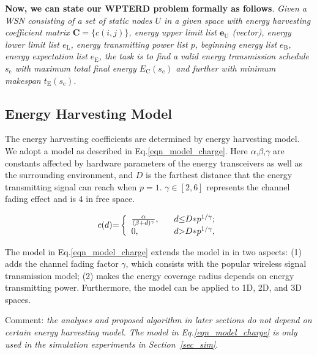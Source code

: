 \documentclass[12pt,journal,onecolumn,draftcls]{IEEEtran}
\begin{document}
\textbf{Now, we can state our WPTERD problem formally as follows}. \textit{Given a WSN consisting of a set of static nodes $U$ in a given space with energy harvesting coefficient matrix $\mathbf{C}{=}\{c(i,j)\}$, energy upper limit list $\mathbf{e}_\text{U}$ (vector), energy lower limit list $e_\text{L}$, energy transmitting power list $p$, beginning energy list $e_\text{B}$, energy expectation list $e_\text{E}$, the task is to find a valid energy transmission schedule $s_\text{c}$ with maximum total final energy $E_\text{C}(s_\text{c})$ and further with minimum makespan $t_\text{E}(s_\text{c})$}.

\subsection{Energy Harvesting Model}
The energy harvesting coefficients are determined by energy harvesting model. We adopt a model as described in Eq.\eqref{eqn_model_charge}. Here $\alpha$,$\beta$,$\gamma$ are constants affected by hardware parameters of the energy transceivers as well as the surrounding environment, and $D$ is the farthest distance that the energy transmitting signal can reach when $p{=}1$. $\gamma{\in}[2,6]$ represents the channel fading effect and is 4 in free space.

\begin{equation}
\label{eqn_model_charge}
c(d){=}\left\{
\begin{array}{ll}
\frac{\alpha}{(\beta{+}d)^{\gamma}}, \hspace{3mm}&d{\leq}D{*}p^{1/\gamma};\\
0,&d{>}D{*}p^{1/\gamma},
\end{array}
\right.
\end{equation}

The model in Eq.\eqref{eqn_model_charge} extends the model in \cite{Dai2017TON} in two aspects: (1) adds the channel fading factor $\gamma$, which consists with the popular wireless signal transmission model; (2) makes the energy coverage radius depends on energy transmitting power. Furthermore, the model can be applied to 1D, 2D, and 3D spaces.

Comment: \textit{the analyses and proposed algorithm in later sections do not depend on certain energy harvesting model. The model in Eq.\ref{eqn_model_charge} is only used in the simulation experiments in Section~\ref{sec_sim}}.
\end{document}
